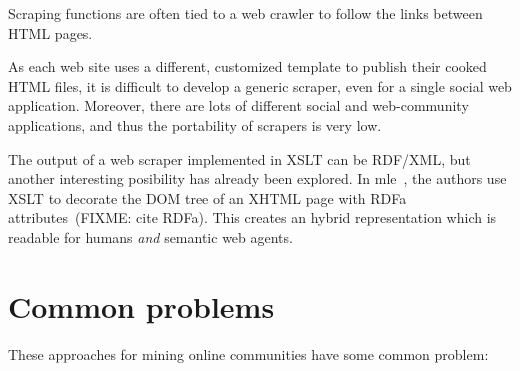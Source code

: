 \documentclass{../templates/www2008-submission}
\begin{document}
Scraping functions are often tied to a web crawler to follow the
links between HTML pages.

As each web site uses a different, customized template to
publish their cooked HTML files, it is
difficult to develop a generic scraper, even for a single social
web application. Moreover, there are lots of different social and
web-community applications, and thus the portability of scrapers
is very low.

The output of a web scraper implemented in XSLT can be RDF/XML, but
another interesting posibility has already been explored. In
mle~\cite{Hausenblas2007}, the authors use XSLT to decorate the
DOM tree of an XHTML page with RDFa attributes~(FIXME: cite RDFa).
This creates an hybrid representation which is readable for
humans \emph{and} semantic web agents.


\section{Common problems}

These approaches for mining online communities have some common problem:
\end{document}
